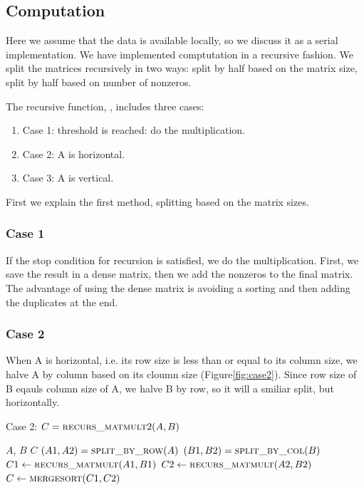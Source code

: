 \subsection{Computation}
\label{sec:comp}
Here we assume that the data is available locally, so we discuss it as a serial implementation. We have implemented comptutation in a recursive fashion. We split the matrices recursively in two ways: split by half based on the matrix size, split by half based on number of nonzeros. 

The recursive function, \recmm, includes three cases:
\begin{enumerate}
 \item Case 1: threshold is reached: do the multiplication.
 \item Case 2: A is horizontal.
 \item Case 3: A is vertical.
\end{enumerate}

First we explain the first method, splitting based on the matrix sizes.

\subsubsection{Case 1}
\label{sec:case1}
If the stop condition for recursion is satisfied, we do the multiplication. 
First, we save the result in a dense matrix, then we add the nonzeros to the final matrix. The advantage of using the dense matrix is avoiding a sorting and then adding the duplicates at the end.

\subsubsection{Case 2}
\label{sec:case2}
When A is horizontal, i.e. its row size is less than or equal to its column size, we halve A by column based on its cloumn size (Figure\ref{fig:case2}). Since row size of B eqauls column size of A, we halve B by row, so it will a smiliar split, but horizontally.

\begin{algorithm}[H] 
  \caption{Case 2: $C = \textsc{recurs\_matmult}2(A, B)$} \label{alg:case2} 
  \begin{algorithmic}[1]
    \Require $A$, $B$
    \Ensure  $C$
    \State $(A1, A2) = \textsc{split\_by\_row}(A)$
    \State $(B1, B2) = \textsc{split\_by\_col}(B)$
    \State $C1 \leftarrow \textsc{recurs\_matmult}(A1,B1)$
    \State $C2 \leftarrow \textsc{recurs\_matmult}(A2,B2)$
    \State $C \leftarrow \textsc{mergesort}(C1, C2)$
  \end{algorithmic}
\end{algorithm}

